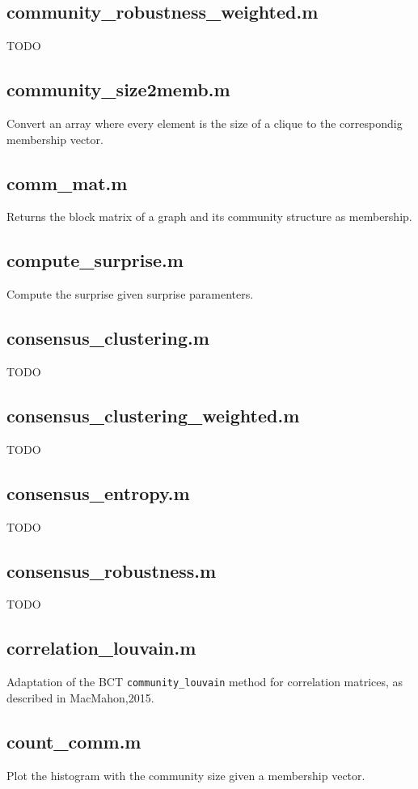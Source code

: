 \documentclass[a4paper]{report}
\begin{document}
  \subsection*{community\_robustness\_weighted.m} TODO

  \subsection*{community\_size2memb.m} Convert an array where every element
  is the size of a clique to the correspondig membership vector.

  \subsection*{comm\_mat.m} Returns the block matrix of a graph and its
  community structure as membership.

  \subsection*{compute\_surprise.m} Compute the surprise given surprise
  paramenters.

  \subsection*{consensus\_clustering.m} TODO

  \subsection*{consensus\_clustering\_weighted.m} TODO

  \subsection*{consensus\_entropy.m} TODO

  \subsection*{consensus\_robustness.m} TODO

  \subsection*{correlation\_louvain.m} Adaptation of the BCT
  \texttt{community\_louvain} method for correlation matrices, as
  described in MacMahon,2015.

  \subsection*{count\_comm.m} Plot the histogram with the community size
  given a membership vector.
\end{document}
